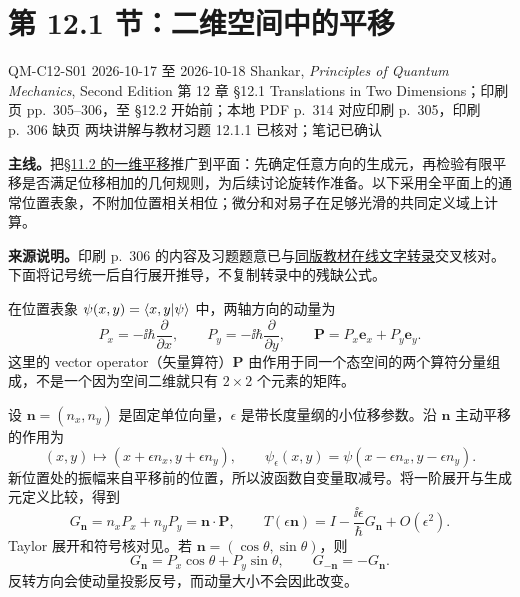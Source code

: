 \section{第 12.1 节：二维空间中的平移}
\label{section:QM-C12-S01}
\studymeta
  {QM-C12-S01}
  {2026-10-17 至 2026-10-18}
  {Shankar, \textit{Principles of Quantum Mechanics}, Second Edition}
  {第 12 章 \S 12.1 Translations in Two Dimensions；印刷页 pp.~305--306，至 \S 12.2 开始前；本地 PDF p.~314 对应印刷 p.~305，印刷 p.~306 缺页}
  {两块讲解与教材习题 12.1.1 已核对；笔记已确认}

\textbf{主线。}把\hyperref[section:QM-C11-S02]{\S 11.2 的一维平移}推广到平面：先确定任意方向的生成元，再检验有限平移是否满足位移相加的几何规则，为后续讨论旋转作准备。以下采用全平面上的通常位置表象，不附加位置相关相位；微分和对易子在足够光滑的共同定义域上计算。

\textbf{来源说明。}印刷 p.~306 的内容及习题题意已与\href{https://djvu.online/file/SJ0IX5VK7Mxio}{同版教材在线文字转录}交叉核对。下面将记号统一后自行展开推导，不复制转录中的残缺公式。


在位置表象 $\psi(x,y)=\left\langle x,y \middle| \psi \right\rangle$ 中，两轴方向的动量为
\begin{equation}
  P_x=-\ii\hbar\frac{\partial}{\partial x},\qquad
  P_y=-\ii\hbar\frac{\partial}{\partial y},\qquad
  \mathbf P=P_x\mathbf e_x+P_y\mathbf e_y.
\end{equation}
这里的 vector operator（矢量算符）$\mathbf P$ 由作用于同一个态空间的两个算符分量组成，不是一个因为空间二维就只有 $2\times2$ 个元素的矩阵。

设 $\mathbf n=(n_x,n_y)$ 是固定单位向量，$\epsilon$ 是带长度量纲的小位移参数。沿 $\mathbf n$ 主动平移的作用为
\begin{equation}
  (x,y)\longmapsto(x+\epsilon n_x,y+\epsilon n_y),\qquad
  \psi_\epsilon(x,y)=\psi(x-\epsilon n_x,y-\epsilon n_y).
\end{equation}
新位置处的振幅来自平移前的位置，所以波函数自变量取减号。将一阶展开与生成元定义比较，得到
\begin{equation}
  \boxed{G_{\mathbf n}=n_xP_x+n_yP_y=\mathbf n\cdot\mathbf P},\qquad
  T(\epsilon\mathbf n)
  =I-\frac{\ii\epsilon}{\hbar}G_{\mathbf n}+O(\epsilon^2).
  \label{eq:QM-C12-S01-direction-generator}
\end{equation}
Taylor 展开和符号核对见。若 $\mathbf n=(\cos\theta,\sin\theta)$，则
\begin{equation}
  G_{\mathbf n}=P_x\cos\theta+P_y\sin\theta,\qquad
  G_{-\mathbf n}=-G_{\mathbf n}.
\end{equation}
反转方向会使动量投影反号，而动量大小不会因此改变。

